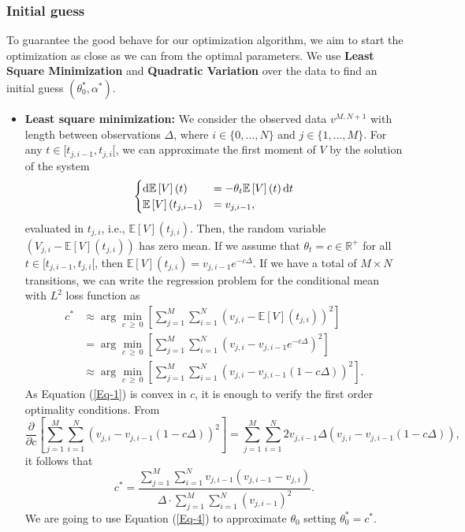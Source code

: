 \documentclass[11pt]{article}
\theoremstyle{definition}
\newcommand{\E}{\mathbb{E}}
\newcommand{\R}{\mathbb{R}}
\begin{document}
\subsubsection{Initial guess}

To guarantee the good behave for our optimization algorithm, we aim to start the optimization as close as we can from the optimal parameters. We use \textbf{Least Square Minimization} and \textbf{Quadratic Variation} over the data to find an initial guess $(\theta_0^*,\alpha^*)$.

\begin{itemize}

\item \textbf{Least square minimization:} We consider the observed data $v^{M,N+1}$ with length between observations $\Delta$, where $i\in\{0,\dots,N\}$ and $j\in\{1,\dots,M\}$. For any $t\in [t_{j,i-1}, t_{j, i}[$, we can approximate the first moment of $V$ by the solution of the system
\begin{equation*}
\begin{cases}
\dif \E\left[V\right](t)&=-\theta_t\E\left[V\right](t)\dif t\\
\E\left[V\right](t_{j,i-1})&=v_{j,i-1},
\end{cases}
\end{equation*}
evaluated in $t_{j,i}$, i.e., $\E\left[V\right](t_{j,i})$. Then, the random variable $(V_{j,i}-\E\left[V\right](t_{j,i}))$ has zero mean. If we assume that $\theta_t=c\in\R^+$ for all $t\in[t_{j,i-1},t_{j,i}[$, then $\E\left[V\right](t_{j,i})=v_{j,i-1}e^{-c\Delta}$. If we have a total of $M\times N$ transitions, we can write the regression problem for the conditional mean with $L^2$ loss function as
\begin{equation}
\begin{split}
c^*&\approx\arg\min_{c\ \geq\ 0}\left[\sum_{j=1}^M\sum_{i=1}^{N}\left(v_{j,i}-\E\left[V\right](t_{j,i})\right)^2\right]\\
&=\arg\min_{c\ \geq\ 0}\left[\sum_{j=1}^M\sum_{i=1}^{N}\left(v_{j,i}-v_{j,i-1}e^{-c\Delta}\right)^2\right]\\
&\approx\arg\min_{c\ \geq\ 0}\left[\sum_{j=1}^M\sum_{i=1}^{N}\left(v_{j,i}-v_{j,i-1}(1-c\Delta)\right)^2\right].
\end{split}
\label{Eq-1}
\end{equation}
As Equation (\ref{Eq-1}) is convex in $c$, it is enough to verify the first order optimality conditions. From
\begin{equation*}
\frac{\partial}{\partial c}\left[\sum_{j=1}^M\sum_{i=1}^{N}\left(v_{j,i}-v_{j,i-1}(1-c\Delta)\right)^2\right]=\sum_{j=1}^M\sum_{i=1}^{N}2v_{j,i-1}\Delta\left(v_{j,i}-v_{j,i-1}(1-c\Delta)\right),
\end{equation*}
it follows that
\begin{equation}
c^{*}=\frac{\sum_{j=1}^M\sum_{i=1}^{N}v_{j,i-1}(v_{j,i-1}-v_{j,i})}{\Delta\cdot\sum_{j=1}^M\sum_{i=1}^{N}(v_{j,i-1})^2}.
\label{Eq-4}
\end{equation}
We are going to use Equation (\ref{Eq-4}) to approximate $\theta_0$ setting $\theta_0^*=c^*$.


\end{itemize}
\end{document}
